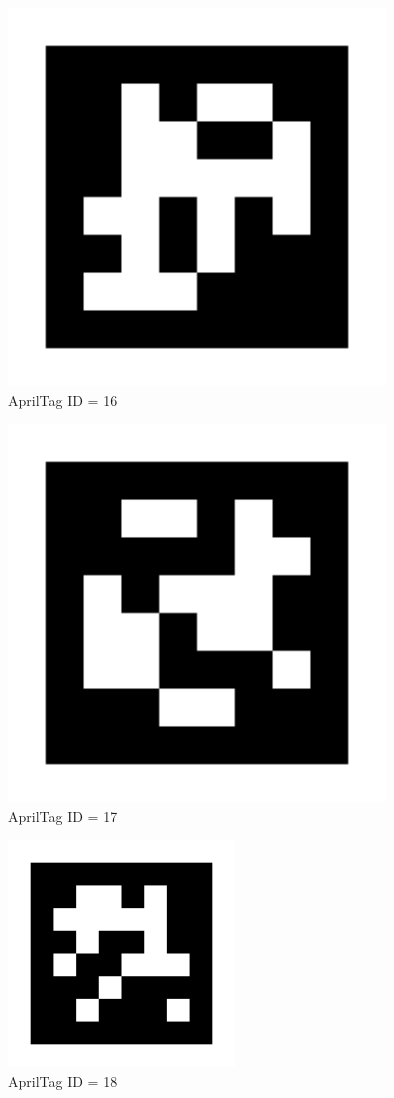 \documentclass[1pt]{article}
\begin{document}
\begin{figure}[ht]
    \centering
    \includegraphics{AprilTag/tag31_11_00016.png}
    \caption{AprilTag ID = 16}
\end{figure}
\clearpage
\begin{figure}[ht]
    \centering
    \includegraphics{AprilTag/tag31_11_00017.png}
    \caption{AprilTag ID = 17}
\end{figure}
\clearpage
\begin{figure}[ht]
    \centering
    \includegraphics{AprilTag/tag31_11_00018.png}
    \caption{AprilTag ID = 18}
\end{figure}
\end{document}
